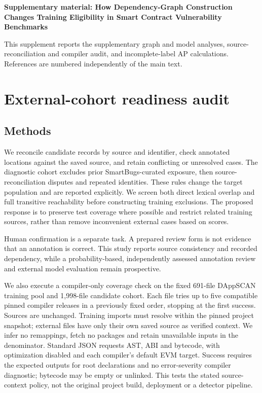 \documentclass[preprint,12pt]{elsarticle}
\begin{document}
\begin{center}\Large\bfseries Supplementary material: How Dependency-Graph Construction Changes Training Eligibility in Smart Contract Vulnerability Benchmarks\end{center}
\renewcommand{\thesection}{S\arabic{section}}\renewcommand{\thetable}{S\arabic{table}}\renewcommand{\thefigure}{S\arabic{figure}}
This supplement reports the supplementary graph and model analyses, source-reconciliation and compiler audit, and incomplete-label AP calculations. References are numbered independently of the main text.

\section{External-cohort readiness audit}\label{external-cohort-readiness-audit}

\subsection{Methods}\label{methods}

We reconcile candidate records by source and identifier, check annotated locations against the saved source, and retain conflicting or unresolved cases. The diagnostic cohort excludes prior SmartBugs-curated exposure, then source-reconciliation disputes and repeated identities. These rules change the target population and are reported explicitly. We screen both direct lexical overlap and full transitive reachability before constructing training exclusions. The proposed response is to preserve test coverage where possible and restrict related training sources, rather than remove inconvenient external cases based on scores.

Human confirmation is a separate task. A prepared review form is not evidence that an annotation is correct. This study reports source consistency and recorded dependency, while a probability-based, independently assessed annotation review and external model evaluation remain prospective.

We also execute a compiler-only coverage check on the fixed 691-file DAppSCAN training pool and 1,998-file candidate cohort. Each file tries up to five compatible pinned compiler releases in a previously fixed order, stopping at the first success. Sources are unchanged. Training imports must resolve within the pinned project snapshot; external files have only their own saved source as verified context. We infer no remappings, fetch no packages and retain unavailable inputs in the denominator. Standard JSON requests AST, ABI and bytecode, with optimization disabled and each compiler's default EVM target. Success requires the expected outputs for root declarations and no error-severity compiler diagnostic; bytecode may be empty or unlinked. This tests the stated source-context policy, not the original project build, deployment or a detector pipeline.
\end{document}
